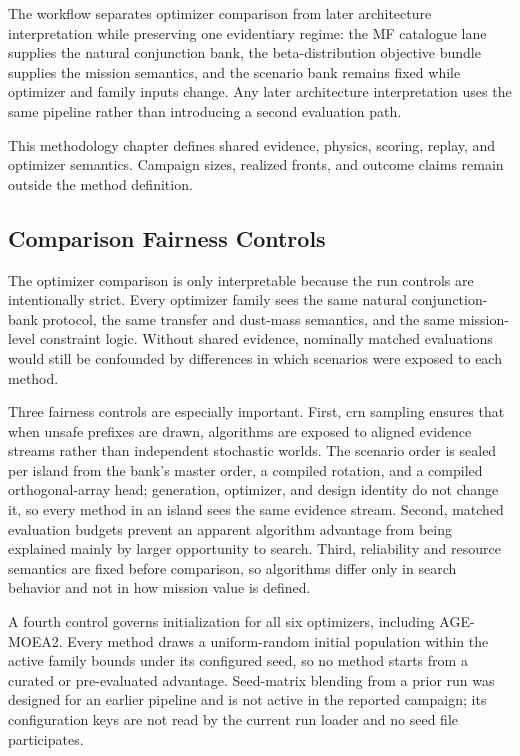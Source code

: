     The workflow separates optimizer comparison from later architecture interpretation while preserving one evidentiary regime: the MF catalogue lane supplies the natural conjunction bank, the beta-distribution objective bundle supplies the mission semantics, and the scenario bank remains fixed while optimizer and family inputs change. Any later architecture interpretation uses the same pipeline rather than introducing a second evaluation path.

    This methodology chapter defines shared evidence, physics, scoring, replay, and optimizer semantics. Campaign sizes, realized fronts, and outcome claims remain outside the method definition.

    \subsection{Comparison Fairness Controls}
    The optimizer comparison is only interpretable because the run controls are intentionally strict. Every optimizer family sees the same natural conjunction-bank protocol, the same transfer and dust-mass semantics, and the same mission-level constraint logic. Without shared evidence, nominally matched evaluations would still be confounded by differences in which scenarios were exposed to each method.

    Three fairness controls are especially important. First, \gls{crn} sampling ensures that when unsafe prefixes are drawn, algorithms are exposed to aligned evidence streams rather than independent stochastic worlds. The scenario order is sealed per island from the bank's master order, a compiled rotation, and a compiled orthogonal-array head; generation, optimizer, and design identity do not change it, so every method in an island sees the same evidence stream. Second, matched evaluation budgets prevent an apparent algorithm advantage from being explained mainly by larger opportunity to search. Third, reliability and resource semantics are fixed before comparison, so algorithms differ only in search behavior and not in how mission value is defined.

    A fourth control governs initialization for all six optimizers, including AGE-MOEA2. Every method draws a uniform-random initial population within the active family bounds under its configured seed, so no method starts from a curated or pre-evaluated advantage. Seed-matrix blending from a prior run was designed for an earlier pipeline and is not active in the reported campaign; its configuration keys are not read by the current run loader and no seed file participates.

